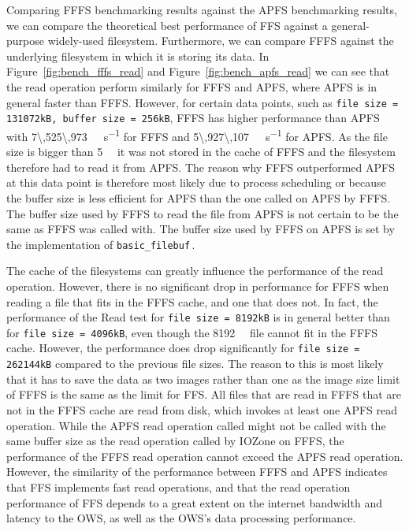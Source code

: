 Comparing \gls{FFFS} benchmarking results against the \gls{APFS} benchmarking results, we can compare the theoretical best performance of \gls{FFS} against a \mbox{general-purpose} \mbox{widely-used} filesystem. Furthermore, we can compare \gls{FFFS} against the underlying filesystem in which it is storing its data. In Figure~\ref{fig:bench_fffs_read} and Figure~\ref{fig:bench_apfs_read} we can see that the read operation perform similarly for \gls{FFFS} and \gls{APFS}, where \gls{APFS} is in general faster than \gls{FFFS}. However, for certain data points, such as \texttt{file size = 131072kB, buffer size = 256kB}, \gls{FFFS} has higher performance than \gls{APFS} with \SI[per-mode = symbol]{7\,525\,973}{\kilo\byte\per\second} for \gls{FFFS} and \SI[per-mode = symbol]{5\,927\,107}{\kilo\byte\per\second} for \gls{APFS}. As the file size is bigger than \SI{5}{\mega\byte} it was not stored in the cache of \gls{FFFS} and the filesystem therefore had to read it from \gls{APFS}. The reason why \gls{FFFS} outperformed \gls{APFS} at this data point is therefore most likely due to process scheduling or because the buffer size is less efficient for \gls{APFS} than the one called on \gls{APFS} by \gls{FFFS}. The buffer size used by \gls{FFFS} to read the file from \gls{APFS} is not certain to be the same as \gls{FFFS} was called with. The buffer size used by \gls{FFFS} on \gls{APFS} is set by the implementation of \texttt{basic\_filebuf}\,\cite{cppreference.comStdBasicFilebuf2020}.

The cache of the filesystems can greatly influence the performance of the read operation. However, there is no significant drop in performance for \gls{FFFS} when reading a file that fits in the \gls{FFFS} cache, and one that does not. In fact, the performance of the Read test for \texttt{file size = 8192kB} is in general better than for \texttt{file size = 4096kB}, even though the \SI{8192}{\kilo\byte} file cannot fit in the \gls{FFFS} cache. However, the performance does drop significantly for \texttt{file size = 262144kB} compared to the previous file sizes. The reason to this is most likely that it has to save the data as two images rather than one as the image size limit of \gls{FFFS} is the same as the limit for \gls{FFS}. All files that are read in \gls{FFFS} that are not in the \gls{FFFS} cache are read from disk, which invokes at least one \gls{APFS} read operation. While the \gls{APFS} read operation called might not be called with the same buffer size as the read operation called by IOZone on \gls{FFFS}, the performance of the \gls{FFFS} read operation cannot exceed the \gls{APFS} read operation. However, the similarity of the performance between \gls{FFFS} and \gls{APFS} indicates that \gls{FFS} implements fast read operations, and that the read operation performance of \gls{FFS} depends to a great extent on the internet bandwidth and latency to the \gls{OWS}, as well as the \gls{OWS}'s data processing performance.

